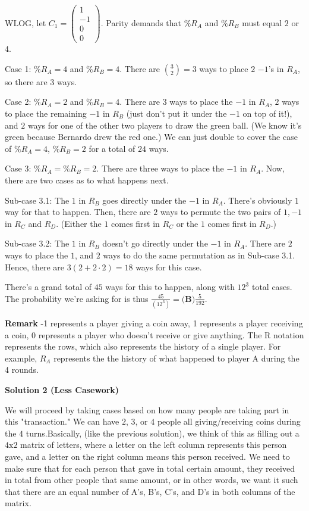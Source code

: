 \begin{enumerate}
 WLOG, let $C_1 = \begin{pmatrix} 1\\-1\\0\\0\end{pmatrix}$. Parity demands that $\%R_A$ and $\%R_B$ must equal $2$ or $4$. 

 Case 1: $\%R_A = 4$ and $\%R_B = 4$. There are $\binom{3}{2}=3$ ways to place $2$ $-1$'s in $R_A$, so there are $3$ ways.

 Case 2: $\%R_A = 2$ and $\%R_B=4$. There are $3$ ways to place the $-1$ in $R_A$, $2$ ways to place the remaining $-1$ in $R_B$ (just don't put it under the $-1$ on top of it!), and $2$ ways for one of the other two players to draw the green ball. (We know it's green because Bernardo drew the red one.) We can just double to cover the case of $\%R_A = 4$, $\%R_B = 2$ for a total of $24$ ways.

 Case 3: $\%R_A=\%R_B=2$. There are three ways to place the $-1$ in $R_A$. Now, there are two cases as to what happens next.

 Sub-case 3.1: The $1$ in $R_B$ goes directly under the $-1$ in $R_A$. There's obviously $1$ way for that to happen. Then, there are $2$ ways to permute the two pairs of $1, -1$ in $R_C$ and $R_D$. (Either the $1$ comes first in $R_C$ or the $1$ comes first in $R_D$.)

 Sub-case 3.2: The $1$ in $R_B$ doesn't go directly under the $-1$ in $R_A$. There are $2$ ways to place the $1$, and $2$ ways to do the same permutation as in Sub-case 3.1. Hence, there are $3(2+2 \cdot 2)=18$ ways for this case.

 There's a grand total of $45$ ways for this to happen, along with $12^3$ total cases. The probability we're asking for is thus $\frac{45}{(12^3)}= \boxed{\textbf{(B)}\frac{5}{192}}$.

 \textbf{Remark} -1 represents a player giving a coin away, 1 represents a player receiving a coin, 0 represents a player who doesn't receive or give anything. The R notation represents the rows, which also represents the history of a single player. For example, $R_A$ represents the the history of what happened to player A during the 4 rounds.

 



\textbf{Solution 2 (Less Casework)}

We will proceed by taking cases based on how many people are taking part in this "transaction." We can have $2$, $3$, or $4$ people all giving/receiving coins during the $4$ turns.Basically, (like the previous solution), we think of this as filling out a $4\text{x}2$ matrix of letters, where a letter on the left column represents this person gave, and a letter on the right column means this person received. We need to make sure that for each person that gave in total certain amount, they received in total from other people that same amount, or in other words, we want it such that there are an equal number of A's, B's, C's, and D's in both columns of the matrix.


\end{enumerate}
